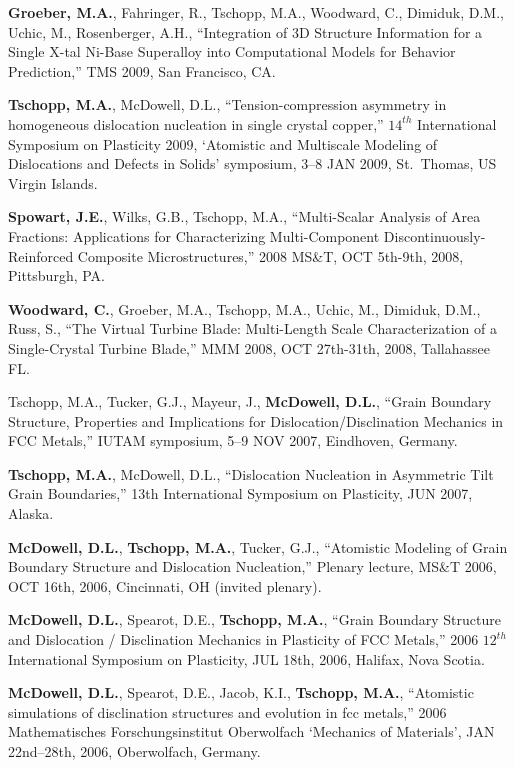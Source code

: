 \begin{cvlist}
\item
\textbf{Groeber, M.A.}, Fahringer, R., {Tschopp, M.A.}, Woodward, C., Dimiduk, D.M., Uchic, M., Rosenberger, A.H., ``Integration of 3D Structure Information for a Single X-tal Ni-Base Superalloy into Computational Models for Behavior Prediction,'' TMS 2009, San Francisco, CA.  

\item
\textbf{Tschopp, M.A.}, McDowell, D.L., ``Tension-compression asymmetry in homogeneous dislocation nucleation in single crystal copper,'' $14^{th}$ International Symposium on Plasticity 2009, `Atomistic and Multiscale Modeling of Dislocations and Defects in Solids' symposium, 3--8 JAN 2009, St.~Thomas, US Virgin Islands.

\item
\textbf{Spowart, J.E.}, Wilks, G.B., {Tschopp, M.A.}, ``Multi-Scalar Analysis of Area Fractions: Applications for Characterizing Multi-Component Discontinuously-Reinforced Composite Microstructures,'' 2008 MS\&T, OCT 5th-9th, 2008, Pittsburgh, PA.

\item
\textbf{Woodward, C.}, Groeber, M.A., {Tschopp, M.A.}, Uchic, M., Dimiduk, D.M., Russ, S., ``The Virtual Turbine Blade: Multi-Length Scale Characterization of a Single-Crystal Turbine Blade,'' MMM 2008, OCT 27th-31th, 2008, Tallahassee FL.

\item
{Tschopp, M.A.}, Tucker, G.J., Mayeur, J., \textbf{McDowell, D.L.}, ``Grain Boundary Structure, Properties and Implications for Dislocation/Disclination Mechanics in FCC Metals,'' IUTAM symposium, 5--9 NOV 2007, Eindhoven, Germany.

\item
\textbf{Tschopp, M.A.}, McDowell, D.L., ``Dislocation Nucleation in Asymmetric Tilt Grain Boundaries,'' 13th International Symposium on Plasticity, JUN 2007, Alaska.

\item
\textbf{McDowell, D.L.}, \textbf{Tschopp, M.A.}, Tucker, G.J., ``Atomistic Modeling of Grain Boundary Structure and Dislocation Nucleation,'' Plenary lecture, MS\&T 2006, OCT 16th, 2006, Cincinnati, OH (invited plenary).

\item
\textbf{McDowell, D.L.}, Spearot, D.E., \textbf{Tschopp, M.A.},  ``Grain Boundary Structure and Dislocation / Disclination Mechanics in Plasticity of FCC Metals,''  2006 $12^{th}$ International Symposium on Plasticity, JUL 18th, 2006, Halifax, Nova Scotia.

\item
\textbf{McDowell, D.L.}, Spearot, D.E., Jacob, K.I., \textbf{Tschopp, M.A.},  ``Atomistic simulations of disclination structures and evolution in fcc metals,''  2006 Mathematisches Forschungsinstitut Oberwolfach `Mechanics of Materials', JAN 22nd--28th, 2006, Oberwolfach, Germany.

\end{cvlist}

